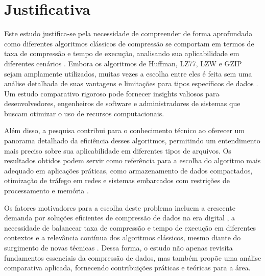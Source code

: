 \chapter{Justificativa}
\label{c.justificativa}

Este estudo justifica-se pela necessidade de compreender de forma aprofundada como diferentes algoritmos clássicos de compressão se comportam em termos de taxa de compressão e tempo de execução, analisando sua aplicabilidade em diferentes cenários \cite{salomon2007data}. Embora os algoritmos de Huffman, LZ77, LZW e GZIP sejam amplamente utilizados, muitas vezes a escolha entre eles é feita sem uma análise detalhada de suas vantagens e limitações para tipos específicos de dados \cite{ziv1977universal, welch1984technique}. Um estudo comparativo rigoroso pode fornecer insights valiosos para desenvolvedores, engenheiros de software e administradores de sistemas que buscam otimizar o uso de recursos computacionais.

Além disso, a pesquisa contribui para o conhecimento técnico ao oferecer um panorama detalhado da eficiência desses algoritmos, permitindo um entendimento mais preciso sobre sua aplicabilidade em diferentes tipos de arquivos. Os resultados obtidos podem servir como referência para a escolha do algoritmo mais adequado em aplicações práticas, como armazenamento de dados compactados, otimização de tráfego em redes e sistemas embarcados com restrições de processamento e memória \cite{deutsch1996gzip, collet2016zstandard}.

Os fatores motivadores para a escolha deste problema incluem a crescente demanda por soluções eficientes de compressão de dados na era digital \cite{alakuijala2016brotli}, a necessidade de balancear taxa de compressão e tempo de execução em diferentes contextos e a relevância contínua dos algoritmos clássicos, mesmo diante do surgimento de novas técnicas \cite{collet2016zstandard}. Dessa forma, o estudo não apenas revisita fundamentos essenciais da compressão de dados, mas também propõe uma análise comparativa aplicada, fornecendo contribuições práticas e teóricas para a área.

